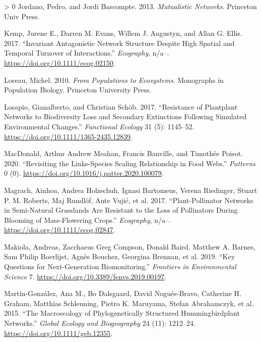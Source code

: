 \documentclass[11pt]{article}
\newlength{\cslhangindent}
\newenvironment{CSLReferences}[3] %
 {%
  \setlength{\parindent}{0pt}
  \ifodd #1 \everypar{\setlength{\hangindent}{\cslhangindent}}\ignorespaces\fi
  \ifnum #2 > 0
  \setlength{\parskip}{#2\baselineskip}
  \fi
 }%
 {}
\begin{document}
\begin{CSLReferences}{1}{0}
\leavevmode\hypertarget{ref-Jordano2013MutNet}{}%
Jordano, Pedro, and Jordi Bascompte. 2013. \emph{Mutualistic Networks}.
Princeton Univ Press.

\leavevmode\hypertarget{ref-Kemp2017InvAnt}{}%
Kemp, Jurene E., Darren M. Evans, Willem J. Augustyn, and Allan G.
Ellis. 2017. {``Invariant Antagonistic Network Structure Despite High
Spatial and Temporal Turnover of Interactions.''} \emph{Ecography},
n/a--. \url{https://doi.org/10.1111/ecog.02150}.

\leavevmode\hypertarget{ref-Loreau2010PopEco}{}%
Loreau, Michel. 2010. \emph{From Populations to Ecosystems}. Monographs
in Population Biology. Princeton University Press.

\leavevmode\hypertarget{ref-Losapio2017ResPla}{}%
Losapio, Gianalberto, and Christian Schöb. 2017. {``Resistance of
Plantplant Networks to Biodiversity Loss and Secondary Extinctions
Following Simulated Environmental Changes.''} \emph{Functional Ecology}
31 (5): 1145--52. \url{https://doi.org/10.1111/1365-2435.12839}.

\leavevmode\hypertarget{ref-MacDonald2020RevLin}{}%
MacDonald, Arthur Andrew Meahan, Francis Banville, and Timothée Poisot.
2020. {``Revisiting the Links-Species Scaling Relationship in Food
Webs.''} \emph{Patterns} 0 (0).
\url{https://doi.org/10.1016/j.patter.2020.100079}.

\leavevmode\hypertarget{ref-Magrach2017PlaNet}{}%
Magrach, Ainhoa, Andrea Holzschuh, Ignasi Bartomeus, Verena Riedinger,
Stuart P. M. Roberts, Maj Rundlöf, Ante Vujić, et al. 2017.
{``Plant-Pollinator Networks in Semi-Natural Grasslands Are Resistant to
the Loss of Pollinators During Blooming of Mass-Flowering Crops.''}
\emph{Ecography}, n/a--. \url{https://doi.org/10.1111/ecog.02847}.

\leavevmode\hypertarget{ref-Makiola2019KeyQue}{}%
Makiola, Andreas, Zacchaeus Greg Compson, Donald Baird, Matthew A.
Barnes, Sam Philip Boerlijst, Agnès Bouchez, Georgina Brennan, et al.
2019. {``Key Questions for Next-Generation Biomonitoring.''}
\emph{Frontiers in Environmental Science} 7.
\url{https://doi.org/10.3389/fenvs.2019.00197}.

\leavevmode\hypertarget{ref-Martin-Gonzalez2015MacPhy}{}%
Martín-González, Ana M., Bo Dalsgaard, David Nogués-Bravo, Catherine H.
Graham, Matthias Schleuning, Pietro K. Maruyama, Stefan Abrahamczyk, et
al. 2015. {``The Macroecology of Phylogenetically Structured
Hummingbirdplant Networks.''} \emph{Global Ecology and Biogeography} 24
(11): 1212--24. \url{https://doi.org/10.1111/geb.12355}.


\end{CSLReferences}
\end{document}
